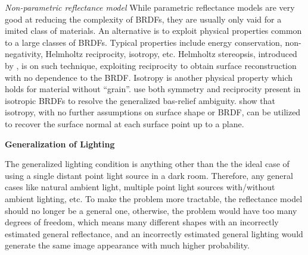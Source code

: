 \textit{Non-parametric reflectance model} While parametric reflectance models are very good at reducing the complexity of BRDFs, they are usually only vaid for a imited class of materials. An alternative is to exploit physical properties common to a large classes of BRDFs. Typical properties include energy conservation, non-negativity, Helmholtz reciprocity, isotropy, etc. Helmholtz stereopsis, introduced by \citeauthor{zickler2002helmholtz}, is on such technique, exploiting reciprocity to obtain surface reconstruction with no dependence to the BRDF. Isotropy is another physical property which holds for material without ``grain''. \citeauthor{tan2007isotropy} use both symmetry and reciprocity present in isotropic BRDFs to resolve the generalized bas-relief ambiguity. \citeauthor{alldrin2007toward} show that isotropy, with no further assumptions on surface shape or BRDF, can be utilized to recover the surface normal at each surface point up to a plane.

\textbf{Generalization of Lighting}

The generalized lighting condition is anything other than the the ideal case of using a single distant point light source in a dark room. Therefore, any general cases like natural ambient light, multiple point light sources with/without ambient lighting, etc. To make the problem more tractable, the reflectance model should no longer be a general one, otherwise, the problem would have too many degrees of freedom, which means many different shapes with an incorrectly estimated general reflectance, and an incorrectly estimated general lighting would generate the same image appearance with much higher probability.

